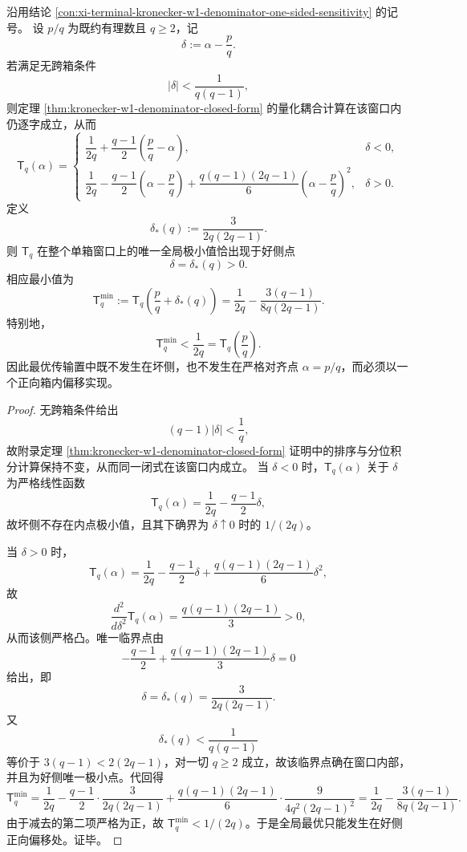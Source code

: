 \begin{theorem}\label{thm:xi-kronecker-w1-single-box-optimal-centering}
沿用结论 \ref{con:xi-terminal-kronecker-w1-denominator-one-sided-sensitivity} 的记号。
设 \(p/q\) 为既约有理数且 \(q\ge 2\)，记
\[
\delta:=\alpha-\frac pq.
\]
若满足无跨箱条件
\[
|\delta|<\frac{1}{q(q-1)},
\]
则定理 \ref{thm:kronecker-w1-denominator-closed-form} 的量化耦合计算在该窗口内仍逐字成立，从而
\[
\mathsf{T}_q(\alpha)=
\begin{cases}
\dfrac{1}{2q}+\dfrac{q-1}{2}\left(\dfrac pq-\alpha\right),& \delta<0,\\[2mm]
\dfrac{1}{2q}-\dfrac{q-1}{2}\left(\alpha-\dfrac pq\right)
+\dfrac{q(q-1)(2q-1)}{6}\left(\alpha-\dfrac pq\right)^2,& \delta>0.
\end{cases}
\]
定义
\[
\delta_\ast(q):=\frac{3}{2q(2q-1)}.
\]
则 \(\mathsf{T}_q\) 在整个单箱窗口上的唯一全局极小值恰出现于好侧点
\[
\delta=\delta_\ast(q)>0.
\]
相应最小值为
\[
\boxed{\;
\mathsf{T}_q^{\min}
:=
\mathsf{T}_q\!\left(\frac pq+\delta_\ast(q)\right)
=
\frac1{2q}-\frac{3(q-1)}{8q(2q-1)}.\;}
\]
特别地，
\[
\boxed{\;\mathsf{T}_q^{\min}<\frac1{2q}=\mathsf{T}_q\!\left(\frac pq\right).\;}
\]
因此最优传输置中既不发生在坏侧，也不发生在严格对齐点 \(\alpha=p/q\)，而必须以一个正向箱内偏移实现。
\end{theorem}
\begin{proof}
无跨箱条件给出
\[
(q-1)|\delta|<\frac1q,
\]
故附录定理 \ref{thm:kronecker-w1-denominator-closed-form} 证明中的排序与分位积分计算保持不变，从而同一闭式在该窗口内成立。
当 \(\delta<0\) 时，\(\mathsf{T}_q(\alpha)\) 关于 \(\delta\) 为严格线性函数
\[
\mathsf{T}_q(\alpha)=\frac1{2q}-\frac{q-1}{2}\delta,
\]
故坏侧不存在内点极小值，且其下确界为 \(\delta\uparrow 0\) 时的 \(1/(2q)\)。

当 \(\delta>0\) 时，
\[
\mathsf{T}_q(\alpha)
=
\frac1{2q}-\frac{q-1}{2}\delta
+\frac{q(q-1)(2q-1)}{6}\delta^2,
\]
故
\[
\frac{d^2}{d\delta^2}\mathsf{T}_q(\alpha)=\frac{q(q-1)(2q-1)}3>0,
\]
从而该侧严格凸。唯一临界点由
\[
-\frac{q-1}{2}+\frac{q(q-1)(2q-1)}{3}\delta=0
\]
给出，即
\[
\delta=\delta_\ast(q)=\frac{3}{2q(2q-1)}.
\]
又
\[
\delta_\ast(q)<\frac1{q(q-1)}
\]
等价于 \(3(q-1)<2(2q-1)\)，对一切 \(q\ge 2\) 成立，故该临界点确在窗口内部，并且为好侧唯一极小点。代回得
\[
\mathsf{T}_q^{\min}
=
\frac1{2q}
-\frac{q-1}{2}\cdot\frac{3}{2q(2q-1)}
+\frac{q(q-1)(2q-1)}{6}\cdot\frac{9}{4q^2(2q-1)^2}
=
\frac1{2q}-\frac{3(q-1)}{8q(2q-1)}.
\]
由于减去的第二项严格为正，故 \(\mathsf{T}_q^{\min}<1/(2q)\)。于是全局最优只能发生在好侧正向偏移处。证毕。
\end{proof}

